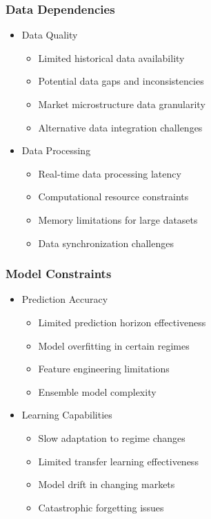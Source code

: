\documentclass[conference]{IEEEtran}
\begin{document}
\subsubsection{Data Dependencies}
\begin{itemize}
    \item Data Quality
    \begin{itemize}
        \item Limited historical data availability
        \item Potential data gaps and inconsistencies
        \item Market microstructure data granularity
        \item Alternative data integration challenges
    \end{itemize}
    
    \item Data Processing
    \begin{itemize}
        \item Real-time data processing latency
        \item Computational resource constraints
        \item Memory limitations for large datasets
        \item Data synchronization challenges
    \end{itemize}
\end{itemize}

\subsubsection{Model Constraints}
\begin{itemize}
    \item Prediction Accuracy
    \begin{itemize}
        \item Limited prediction horizon effectiveness
        \item Model overfitting in certain regimes
        \item Feature engineering limitations
        \item Ensemble model complexity
    \end{itemize}
    
    \item Learning Capabilities
    \begin{itemize}
        \item Slow adaptation to regime changes
        \item Limited transfer learning effectiveness
        \item Model drift in changing markets
        \item Catastrophic forgetting issues
    \end{itemize}
\end{itemize}
\end{document}

